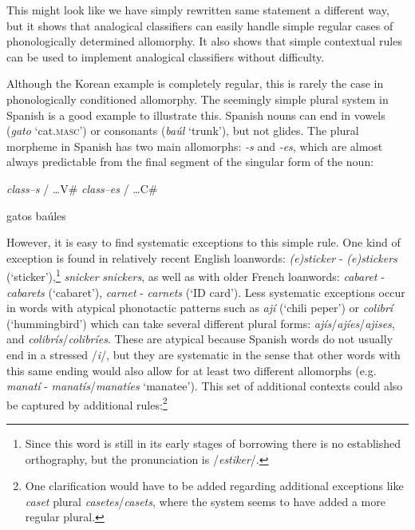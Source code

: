 This might look like we have simply rewritten same statement a different way, but it shows that analogical classifiers can easily handle simple regular cases of phonologically determined allomorphy.
It also shows that simple contextual rules can be used to implement analogical classifiers without difficulty.

Although the Korean example is completely regular, this is rarely the case in phonologically conditioned allomorphy. The seemingly simple plural system in Spanish is a good example to illustrate this. Spanish nouns can end in vowels (\textit{gato} `cat.\textsc{masc}') or consonants (\textit{baúl} `trunk'), but not glides. The plural morpheme in Spanish has two main allomorphs: \textit{-s} and \textit{-es}, which are almost always predictable from the final segment of the singular form of the noun:

\begin{exe}
    \ex
    \begin{xlist}
        \ex \textit{class--s} / \dots{}V\#
        \ex \textit{class--es} / \dots{}C\#
    \end{xlist}
    \ex
    \begin{xlist}
        \ex gatos
        \ex baúles
    \end{xlist}
\end{exe}

However, it is easy to find systematic exceptions to this simple rule. One kind of  exception is found in relatively recent English loanwords: \textit{(e)sticker} - \textit{(e)stickers} (`sticker'),\footnote{Since this word is still in its early stages of borrowing there is no established orthography, but the pronunciation is /\textit{estiker}/.} \textit{snicker} \textit{snickers}, as well as with older French loanwords: \textit{cabaret} - \textit{cabarets} (`cabaret'), \textit{carnet} - \textit{carnets} (`ID card'). Less systematic exceptions occur in words with atypical phonotactic patterns such as \textit{ají} (`chili peper') or \textit{colibrí} (`hummingbird') which can take several different plural forms: \textit{ajís}/\textit{ajíes}/\textit{ajises}, and \textit{colibrís}/\textit{colibríes}. These are atypical because Spanish words do not usually end in a stressed /\textit{i}/, but they are systematic in the sense that other words with this same ending would also allow for at least two different allomorphs (e.g. \textit{manatí} - \textit{manatís}/\textit{manatíes} `manatee'). This set of additional contexts could also be captured by additional rules:\footnote{One clarification would have to be added regarding additional exceptions like \textit{caset} plural \textit{casetes}/\textit{casets}, where the system seems to have added a more regular plural.}

